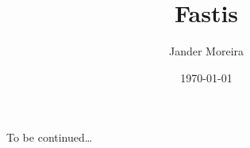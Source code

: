 \documentclass[12pt]{article}
\title{Fastis}
\author{Jander Moreira}
\date{\today}
\begin{document}
To be continued\ldots
\end{document}
